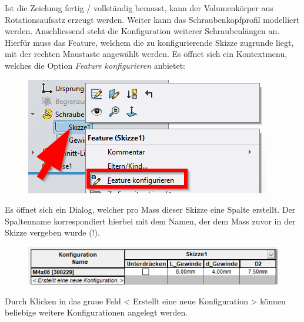 \documentclass[12pt,a4paper]{article}
\begin{document}
	Ist die Zeichnug fertig / vollständig bemasst, kann der Volumenkörper aus Rotationsaufsatz erzeugt werden. Weiter kann das Schraubenkopfprofil modelliert werden. Anschliessend steht die Konfiguration weiterer Schraubenlängen an. Hierfür muss das Feature, welchem die zu konfigurierende Skizze zugrunde liegt, mit der rechten Maustaste angewählt werden. Es öffnet sich ein Kontextmenu, welches die Option \textit{Feature konfigurieren} anbietet:
	\begin{figure}[H]
		\centering
		\includegraphics[width=.6\linewidth]{310123_CAD_PDM/screenshot005}
		\caption{}
		\label{fig:screenshot005}
	\end{figure}\noindent
	\noindent
	Es öffnet sich ein Dialog, welcher pro Mass dieser Skizze eine Spalte erstellt. Der Spaltenname korrespondiert hierbei mit dem Namen, der dem Mass zuvor in der Skizze vergeben wurde (!).
	\begin{figure}[H]
		\centering
		\includegraphics[width=.6\linewidth]{310123_CAD_PDM/screenshot006}
		\caption{}
		\label{fig:Konfigtabelle}
	\end{figure}\noindent
	Durch Klicken in das graue Feld < Erstellt eine neue Konfiguration > können beliebige weitere Konfigurationen angelegt werden. 
\end{document}
